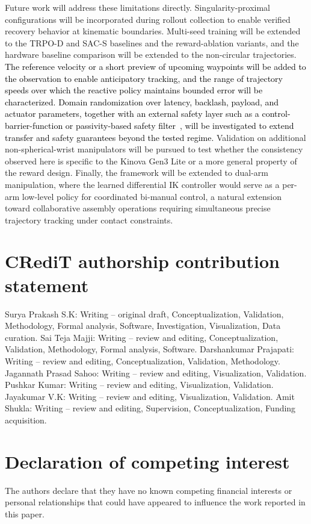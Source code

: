 \documentclass[preprint,12pt]{elsarticle}
\begin{document}
Future work will address these limitations directly. Singularity-proximal
configurations will be incorporated during rollout collection to enable
verified recovery behavior at kinematic boundaries. Multi-seed training will be extended to the TRPO-D and SAC-S baselines and the reward-ablation variants, and the hardware baseline comparison will be extended to the non-circular trajectories. \textcolor{black}{The reference velocity or a short preview of upcoming waypoints will be added to the observation to enable anticipatory tracking, and the range of trajectory speeds over which the reactive policy maintains bounded error will be characterized.} \textcolor{black}{Domain randomization over latency, backlash, payload, and actuator parameters, together with an external safety layer such as a control-barrier-function or passivity-based safety filter~\cite{khan2025quantum}, will be investigated to extend transfer and safety guarantees beyond the tested regime.} Validation on additional
non-spherical-wrist manipulators will be pursued to test whether the
consistency observed here is specific to the Kinova Gen3 Lite or a more
general property of the reward design. Finally, the framework will be
extended to dual-arm manipulation, where the learned differential IK
controller would serve as a per-arm low-level policy for coordinated
bi-manual control, a natural extension toward collaborative assembly
operations requiring simultaneous precise trajectory tracking under contact
constraints.

\section*{CRediT authorship contribution statement}
Surya Prakash S.K: Writing – original draft, Conceptualization, Validation, Methodology, Formal analysis, Software, Investigation, Visualization, Data curation. Sai Teja Majji: Writing – review and editing, Conceptualization, Validation, Methodology, Formal analysis, Software. Darshankumar Prajapati: Writing – review and editing, Conceptualization, Validation, Methodology. Jagannath Prasad Sahoo: Writing – review and editing, Visualization, Validation. Pushkar Kumar: Writing – review and editing, Visualization, Validation. Jayakumar V.K: Writing – review and editing, Visualization, Validation. Amit Shukla: Writing – review and editing, Supervision, Conceptualization, Funding acquisition.
\section*{Declaration of competing interest}
The authors declare that they have no known competing financial
interests or personal relationships that could have appeared to influence the work reported in this paper.
\end{document}
